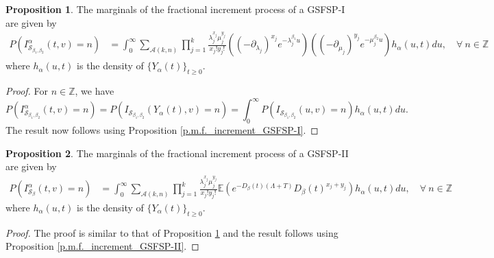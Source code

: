 \documentclass[11pt,oneside,reqno]{amsart}
\theoremstyle{definition}
\newtheorem{proposition}{Proposition}[section]
\theoremstyle{remarkstyle}
\begin{document}
\begin{proposition}\label{p.m.f._fractional_increment_GSFSP-I}
The marginals of the fractional increment process of a GSFSP-I are given by
\begin{align*}
P(I_{\mathcal{S}_{\beta_1,\beta_2}}^\alpha(t,v)=n)&=\int_{0}^{\infty}\sum_{\mathcal{A}(k,n)}\prod_{j=1}^{k}\frac{\lambda_j^{x_j}\mu_j^{y_j}}{x_j!y_j!}((-\partial_{\lambda_j})^{x_j}e^{-\lambda_j^{\beta_1} u})((-\partial_{\mu_j})^{y_j}e^{-\mu_j^{\beta_2} u})h_\alpha(u,t) du,  \quad \forall~n\in \mathbb{Z}\,
\end{align*}
where $h_\alpha(u,t)$ is the density of $\{Y_\alpha(t)\}_{t\geq 0}$. 
\end{proposition}

\begin{proof}
For $n\in\mathbb{Z}$, we have 
\begin{equation*}
 P(I_{\mathcal{S}_{\beta_1,\beta_2}}^\alpha(t,v)=n)=P(I_{\mathcal{S}_{\beta_1,\beta_2}}(Y_\alpha(t),v)=n)=\int_{0}^{\infty}P(I_{\mathcal{S}_{\beta_1,\beta_2}}(u,v)=n)h_\alpha(u,t)du.  
\end{equation*}
The result now follows using Proposition \ref{p.m.f._increment_GSFSP-I}. 
\end{proof}
\begin{proposition}\label{p.m.f._fractional_increment_GSFSP-II}
The marginals of the fractional increment process of a GSFSP-II are given by
\begin{align*}
P(I_{\mathcal{S}_{\beta}}^\alpha(t,v)=n)&=\int_{0}^{\infty}\sum_{\mathcal{A}(k,n)}\prod_{j=1}^{k}\frac{\lambda_j^{x_j}\mu_j^{y_j}}{x_j!y_j!}\mathbb{E}(e^{-D_\beta(t)(\Lambda+T)}D_\beta(t)^{x_j+y_j})h_\alpha(u,t) du,  \quad \forall~n\in \mathbb{Z}\,
\end{align*}
where $h_\alpha(u,t)$ is the density of $\{Y_\alpha(t)\}_{t\geq 0}$. 
\end{proposition}

\begin{proof}
The proof is similar to that of Proposition \ref{p.m.f._fractional_increment_GSFSP-I} and
the result follows using Proposition \ref{p.m.f._increment_GSFSP-II}. 
\end{proof}
\end{document}
